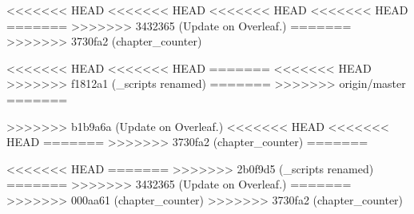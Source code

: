 

% 
% 
\setcounter{chapter}{1}
<<<<<<< HEAD
<<<<<<< HEAD
<<<<<<< HEAD
<<<<<<< HEAD
=======
>>>>>>> 3432365 (Update on Overleaf.)
=======
>>>>>>> 3730fa2 (chapter_counter)

<<<<<<< HEAD
<<<<<<< HEAD
% 
% 
=======
<<<<<<< HEAD
>>>>>>> f1812a1 (_scripts renamed)
=======
>>>>>>> origin/master
% 
% 
=======


>>>>>>> b1b9a6a (Update on Overleaf.)
<<<<<<< HEAD
<<<<<<< HEAD
=======
>>>>>>> 3730fa2 (chapter_counter)
=======

% 
% 
<<<<<<< HEAD
=======
% 
% 
% 
>>>>>>> 2b0f9d5 (_scripts renamed)
=======
>>>>>>> 3432365 (Update on Overleaf.)
=======
>>>>>>> 000aa61 (chapter_counter)
>>>>>>> 3730fa2 (chapter_counter)
% 
% 

